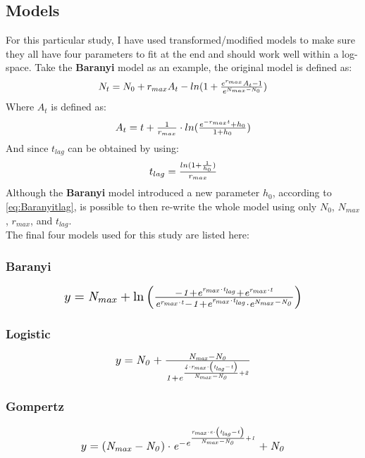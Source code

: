 \documentclass[11pt]{article}
\begin{document}
\subsection{Models}
For this particular study, I have used transformed/modified models to make sure they all have four parameters to fit at the end and should work well within a log-space. Take the \textbf{Baranyi} model as an example, the original model is defined as:
\begin{equation}
\resizebox{.5\hsize}{!}{$N_t = N_0 + r_{max}A_t -ln(1+\frac{e^{r_{max}}A_t-1}{e^{N_{max}-N_0}})$}\label{eq:BaranyiOri}
\end{equation}
Where $A_{t}$ is defined as:
\begin{equation}
\resizebox{.4\hsize}{!}{$A_{t} = t + \frac{1}{r_{max}}\cdot ln(\frac{e^{-r_{max}t}+h_0}{1+h_0})$}\label{eq:BaranyiA}
\end{equation}
And since $t_{lag}$ can be obtained by using: 
\begin{equation}
\resizebox{.2\hsize}{!}{$t_{lag} = \frac{ln(1+\frac{1}{h_0})}{r_{max}}$}\label{eq:Baranyitlag}
\end{equation}
Although the \textbf{Baranyi} model introduced a new parameter $h_{0}$, according to \ref{eq:Baranyitlag}, is possible to then re-write the whole model using only $N_{0}$, $N_{max}$, $r_{max}$, and $t_{lag}$. \\
The final four models used for this study are listed here:
\subsubsection{Baranyi}
\begin{equation}
\resizebox{.7\hsize}{!}{$y = \it N_{max}+ \ln\left(
\frac
{-1 + 
e^{r_{max}\cdot t_{lag}}+e^{r_{max}\cdot t}}
{e^{r_{max}\cdot t}-1+e^{r_{max}\cdot t_{lag}}\cdot e^{N_{max}-N_{0}}}
\right)$}\label{eq:Baranyi}
\end{equation}
\subsubsection{Logistic}
\begin{equation}
\resizebox{.4\hsize}{!}{$y = \it N_{0}+\frac {N_{max} - N_{0}}{1+ e^{\frac{4\cdot r_{max}\cdot\left(t_{lag}-t\right)}{N_{max} - N_{0}}+2}}$}\label{eq:Logistic}
\end{equation}
\subsubsection{Gompertz}
\begin{equation}
\resizebox{.6\hsize}{!}{$ y = \it \left(N_{max} - N_{0}\right)\cdot 
e^{-e^{\frac{r_{max}\cdot e \cdot \left(t_{lag} - t\right)}{N_{max} -N_{0}}+1}}+N_{0}$}\label{eq:Gompertz}
\end{equation}
\end{document}
